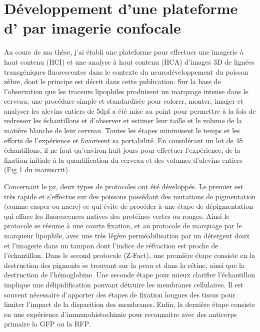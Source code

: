 \documentclass[\main/main.tex]{subfiles}
\begin{document}
\section[Développement d'une plateforme d'HTA]{
    \label{sec:lempereur_bio}
    Développement d'une plateforme d'\hta{} par imagerie confocale
    }
Au cours de ma thèse, j'ai établi une plateforme pour effectuer une imagerie à haut contenu (HCI) et une analyse à haut contenu (HCA) d'images 3D de lignées transgéniques fluorescentes dans le contexte du neurodéveloppement du poisson zèbre, dont le principe est décrit dans cette publication. Sur la base de l'observation que les traceurs lipophiles produisent un marquage intense dans le cerveau, une procédure simple et standardisée pour colorer, monter, imager et analyser les alevins entiers de 5dpf a été mise au point pour permettre à la fois de redresser les échantillons et d'observer et estimer leur taille et le volume de la matière blanche de leur cerveau. Toutes les étapes minimisent le temps et les efforts de l'expérience et favorisent sa portabilité. En considérant un lot de 48 échantillons, il ne faut qu'environ huit jours pour effectuer l'expérience, de la fixation initiale à la quantification du cerveau et des volumes d'alevins entiers (Fig 1 du manuscrit).

%
Concernant le pz{}, deux types de protocoles ont été développés.
Le premier est très rapide et s'effectue sur des poissons possédant des mutations de pigmentation (comme casper ou nacre) ce qui évite de procéder à une étape de dépigmentation qui efface les fluorescences natives des protéines vertes ou rouges. Ainsi le protocole se résume à une courte fixation, et au protocole de marquage par le marqueur lipophile, avec une très légère perméabilisation par un détergent doux et l'imagerie dans un tampon dont l'indice de réfraction est proche de l'échantillon.
Dans le second protocole (Z-Fact), une première étape consiste en la destruction des pigments se trouvant sur la peau
et dans la rétine, ainsi que la destruction de l'hémoglobine.
%
Une seconde étape pour mieux clarifier l'échantillon implique une  délipidification pouvant détruire les membranes cellulaires. Il est souvent nécessaire d'apporter des étapes de fixation longues des tissus pour limiter l'impact de la disparition des membranes.
%
Enfin, la dernière étape consiste en une expérience d'immunohistochimie pour reconnaitre avec des anticorps primaire la GFP ou la RFP.
\end{document}
